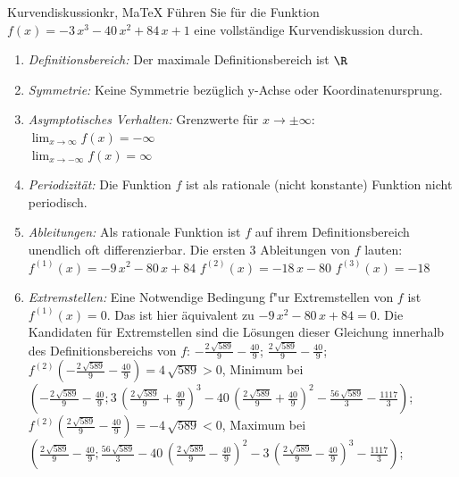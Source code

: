  \providecommand{\MoIl}{(} 
 \providecommand{\MoIr}{)}
 \providecommand{\MIntvlSep}{;} 
 \providecommand{\MElSetSep}{;} 
 \begin{MAufgabe}{Kurvendiskussion}{kr, MaTeX}
 F\"uhren Sie f\"ur die Funktion $f(x)= - 3\, x^3 - 40\, x^2 + 84\, x + 1$ eine vollst\"andige Kurvendiskussion durch.\\ 
 \ifLsg\Loesung
 \begin{enumerate}
 \item \emph{Definitionsbereich:} 
 Der maximale Definitionsbereich ist $\R$\item \emph{Symmetrie:} 
 Keine Symmetrie bez\"uglich y-Achse oder Koordinatenursprung.\item \emph{Asymptotisches Verhalten:} 
 Grenzwerte f\"ur $x\rightarrow \pm \infty$: \\ 
 $\lim_{x\rightarrow \infty} f(x)=- \infty$ \\ 
 $\lim_{x\rightarrow -\infty} f(x)=\infty$ \\ 
 \item \emph{Periodizit\"at:} 
 Die Funktion $f$ ist als rationale (nicht konstante) Funktion nicht periodisch.\item \emph{Ableitungen:} 
 Als rationale Funktion ist $f$ auf ihrem Definitionsbereich unendlich oft differenzierbar. 
 Die ersten 3 Ableitungen von $f$ lauten: \\ 
 $f^{(1)}(x)= - 9\, x^2 - 80\, x + 84$\newline 
  $f^{(2)}(x)= - 18\, x - 80$\newline 
  $f^{(3)}(x)=-18$\newline 
  \item \emph{Extremstellen:} 
 Eine Notwendige Bedingung f"ur Extremstellen von $f$ ist $f^{(1)}(x)=0$. 
 Das ist hier \"aquivalent zu $ - 9\, x^2 - 80\, x + 84=0$. 
 Die Kandidaten f\"ur Extremstellen sind die L\"osungen dieser Gleichung innerhalb des Definitionsbereichs von $f$: $ - \frac{2\, \sqrt{589}}{9} - \frac{40}{9}$; $\frac{2\, \sqrt{589}}{9} - \frac{40}{9}$; \\ 
 $f^{(2)}( - \frac{2\, \sqrt{589}}{9} - \frac{40}{9})=4\, \sqrt{589}$$>0$, Minimum bei $( - \frac{2\, \sqrt{589}}{9} - \frac{40}{9};3\, {\left(\frac{2\, \sqrt{589}}{9} + \frac{40}{9}\right)}^3 - 40\, {\left(\frac{2\, \sqrt{589}}{9} + \frac{40}{9}\right)}^2 - \frac{56\, \sqrt{589}}{3} - \frac{1117}{3})$; \\ 
 $f^{(2)}(\frac{2\, \sqrt{589}}{9} - \frac{40}{9})=- 4\, \sqrt{589}$$<0$, Maximum bei $(\frac{2\, \sqrt{589}}{9} - \frac{40}{9};\frac{56\, \sqrt{589}}{3} - 40\, {\left(\frac{2\, \sqrt{589}}{9} - \frac{40}{9}\right)}^2 - 3\, {\left(\frac{2\, \sqrt{589}}{9} - \frac{40}{9}\right)}^3 - \frac{1117}{3})$; \\ 

\end{enumerate}
\end{MAufgabe}

